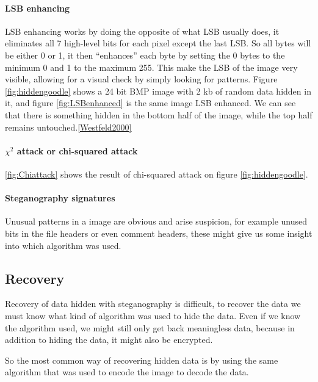 
\paragraph*{LSB enhancing}
LSB enhancing works by doing the opposite of what LSB usually does, it eliminates all 7 high-level bits for each pixel except the last LSB. 
So all bytes will be either 0 or 1, it then ``enhances'' each byte by setting the 0 bytes to the minimum 0 and 1 to the maximum 255.
This make the LSB of the image very visible, allowing for a visual check by simply looking for patterns.
Figure \ref{fig:hiddengoodle} shows a 24 bit BMP image with 2 kb of random data hidden in it, and figure \ref{fig:LSBenhanced} is the same image LSB enhanced.
We can see that there is something hidden in the bottom half of the image, while the top half remains untouched.\ref{Westfeld2000}


\paragraph*{$\chi^2$ attack or chi-squared attack}

\ref{fig:Chiattack} shows the result of chi-squared attack on figure \ref{fig:hiddengoodle}.

\paragraph*{Steganography signatures}
Unusual patterns in a image are obvious and arise suspicion, for example unused bits in the file headers or even comment headers, these might give us some insight into which algorithm was used.

\subsection{Recovery}
Recovery of data hidden with steganography is difficult, to recover the data we must know what kind of algorithm was used to hide the data.
Even if we know the algorithm used, we might still only get back meaningless data, because in addition to hiding the data, it might also be encrypted.

So the most common way of recovering hidden data is by using the same algorithm that was used to encode the image to decode the data.

